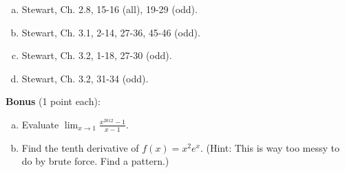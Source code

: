\documentclass[12pt]{article}
\begin{document}
\begin{enumerate}[(a)]
\item
Stewart, Ch. 2.8, 15-16 (all), 19-29 (odd).

\item
Stewart, Ch. 3.1, 2-14, 27-36, 45-46 (odd).

\item
Stewart, Ch. 3.2, 1-18, 27-30 (odd).

\item
Stewart, Ch. 3.2, 31-34 (odd).
\end{enumerate}
{\bf Bonus} (1 point each):
\begin{enumerate}[(a)]
\item
Evaluate $\lim_{x \rightarrow 1} \frac{x^{2012} - 1}{x - 1}.$
\item
Find the tenth derivative of $f(x) = x^2 e^x$. (Hint: This is way too messy
to do by brute force. Find a pattern.)
\end{enumerate}
\end{document}
